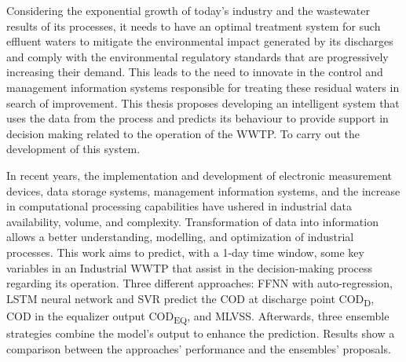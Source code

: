 Considering the exponential growth of today’s industry and the wastewater results of its processes, it needs to have an optimal treatment system for such effluent waters to mitigate the environmental impact generated by its discharges and comply with the environmental regulatory standards that are progressively increasing their demand. This leads to the need to innovate in the control and management information systems responsible for treating these residual waters in search of improvement. This thesis proposes developing an intelligent system that uses the data from the process and predicts its behaviour to provide support in decision making related to the operation of the \ac{WWTP}. To carry out the development of this system.
 
 In recent years, the implementation and development of electronic measurement devices, data storage systems, management information systems, and the increase in computational processing capabilities have ushered in industrial data availability, volume, and complexity. Transformation of data into information allows a better understanding, modelling, and optimization of industrial processes. This work aims to predict, with a 1-day time window, some key variables in an Industrial \ac{WWTP} that assist in the decision-making process regarding its operation. Three different approaches: \ac{FFNN} with auto-regression, \ac{LSTM} neural network and \ac{SVR} predict the \ac{COD} at discharge point \ac{COD}\textsubscript{D}, COD in the equalizer output \ac{COD}\textsubscript{EQ}, and \ac{MLVSS}. Afterwards, three ensemble strategies combine the model’s output to enhance the prediction. Results show a comparison between the approaches’ performance and the ensembles’ proposals.


